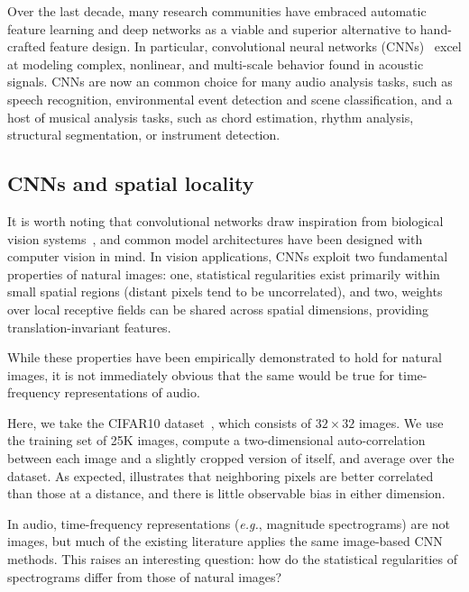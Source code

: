 \documentclass{article}
\def\eg{\emph{e.g.}}
\begin{document}
Over the last decade, many research communities have embraced automatic feature learning and deep networks as a viable and superior alternative to hand-crafted feature design.
In particular, convolutional neural networks (CNNs)~\cite{lecun1998gradient} excel at modeling complex, nonlinear, and multi-scale behavior found in acoustic signals.
CNNs are now an common choice for many audio analysis tasks, such as speech recognition, environmental event detection and scene classification, and a host of musical analysis tasks, such as chord estimation, rhythm analysis, structural segmentation, or instrument detection.

\subsection{CNNs and spatial locality}
It is worth noting that convolutional networks draw inspiration from biological vision systems~\cite{hubel1964effects}, and common model architectures have been designed with computer vision in mind.
In vision applications, CNNs exploit two fundamental properties of natural images:
one, statistical regularities exist primarily within small spatial regions (distant pixels tend to be uncorrelated),
and two, weights over local receptive fields can be shared across spatial dimensions, providing translation-invariant features.

While these properties have been empirically demonstrated to hold for natural images, it is not immediately obvious that the same would be true for time-frequency representations of audio.

Here, we take the CIFAR10 dataset~\cite{krizhevsky2009learning}, which consists of ${32\times 32}$ images.
We use the training set of 25K images, compute a two-dimensional auto-correlation between each image and a slightly cropped version of itself, and average over the dataset.
As expected,  illustrates that neighboring pixels are better correlated than those at a distance, and there is little observable bias in either dimension.

In audio, time-frequency representations (\eg, magnitude spectrograms) are not images, but much of the existing literature applies the same image-based CNN methods.
This raises an interesting question: how do the statistical regularities of spectrograms differ from those of natural images?
\end{document}
